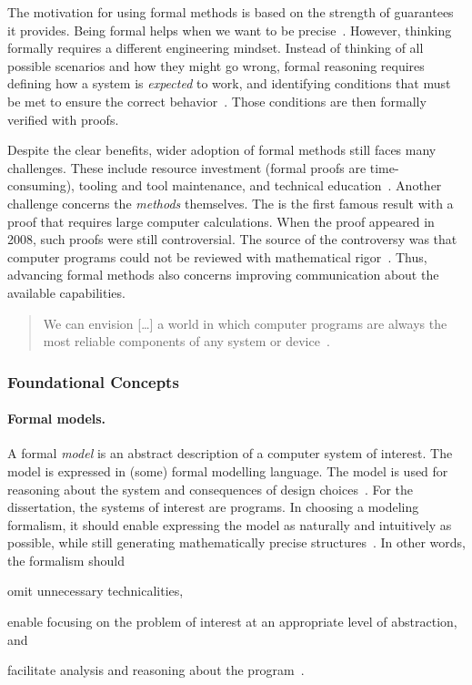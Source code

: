 The motivation for using formal methods is based on the strength of guarantees
it provides. Being formal helps when we want to be precise~\cite{leino2023}.
However, thinking formally requires a different engineering mindset. Instead of
thinking of all possible scenarios and how they might go wrong, formal reasoning
requires defining how a system is \emph{expected} to work, and identifying
conditions that must be met to ensure the correct behavior~\cite{aws2024}. Those
conditions are then formally verified with proofs.

Despite the clear benefits, wider adoption of formal methods still faces many
challenges. These include \eg resource investment (formal proofs are
time-consuming), tooling and tool maintenance, and technical
education~\cite{beek2024}. Another challenge concerns the \emph{methods}
themselves. The  is the first famous result with a proof
that requires large computer calculations. When the proof appeared in 2008, such
proofs were still controversial. The source of the controversy was that computer
programs could not be reviewed with mathematical rigor~\cite{gonthier2008}.
Thus, advancing formal methods also concerns improving communication about the
available capabilities.

\begin{quotation}
\noindent{}We can envision [\ldots] a world in which computer programs are
always the most reliable components of any system or device~\cite{hoare2021}.
\end{quotation}

\subsubsection{Foundational Concepts}
\label{subsubsec:verification-concepts}

\paragraph*{Formal models.} A formal \emph{model} is an abstract description of
a computer system of interest. The model is expressed in (some) formal modelling
language. The model is used for reasoning about the system and consequences of
design choices~\cite{zave2023,olveczky2017}. For the dissertation, the systems
of interest are programs.
In choosing a modeling formalism, it should enable expressing the model as
naturally and intuitively as possible, while still generating mathematically
precise structures~\cite{olveczky2017,beek2024}. In other words, the formalism
should
\begin{enumerate*}[label=(\roman*)]
\item omit unnecessary technicalities,
\item enable focusing on the problem of interest at an appropriate level of
abstraction, and
\item facilitate analysis and reasoning about the program~\cite{olveczky2017}.
\end{enumerate*}

